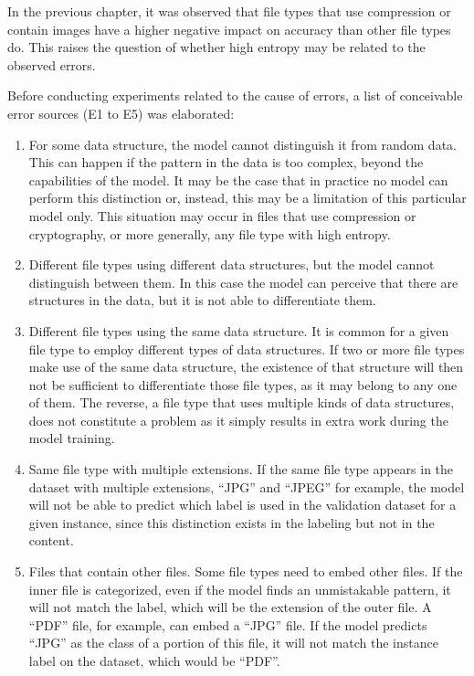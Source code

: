In the previous chapter, it was observed that file types that use compression or contain images have a higher negative impact on accuracy than other file types do. This raises the question of whether high entropy may be related to the observed errors.

Before conducting experiments related to the cause of errors, a list of conceivable error sources (E1 to E5) was elaborated:
\begin{enumerate}[itemindent=\parindent,label=\textbf{E\arabic*.}]
    \item For some data structure, the model cannot distinguish it from random data. This can happen if the pattern in the data is too complex, beyond the capabilities of the model. It may be the case that in practice no model can perform this distinction or, instead, this may be a limitation of this particular model only. This situation may occur in files that use compression or cryptography, or more generally, any file type with high entropy.
    
    \item Different file types using different data structures, but the model cannot distinguish between them. In this case the model can perceive that there are structures in the data, but it is not able to differentiate them.

    \item Different file types using the same data structure. It is common for a given file type to employ different types of data structures. If two or more file types make use of the same data structure, the existence of that structure will then not be sufficient to differentiate those file types, as it may belong to any one of them.
    The reverse, a file type that uses multiple kinds of data structures, does not constitute a problem as it simply results in extra work during the model training.

    \item Same file type with multiple extensions. If the same file type appears in the dataset with multiple extensions, ``JPG'' and ``JPEG'' for example, the model will not be able to predict which label is used in the validation dataset for a given instance, since this distinction exists in the labeling but not in the content.

    \item Files that contain other files. Some file types need to embed other files. If the inner file is categorized, even if the model finds an unmistakable pattern, it will not match the label, which will be the extension of the outer file. A ``PDF'' file, for example, can embed a ``JPG'' file. If the model predicts ``JPG'' as the class of a portion of this file, it will not match the instance label on the dataset, which would be ``PDF''.
\end{enumerate}

